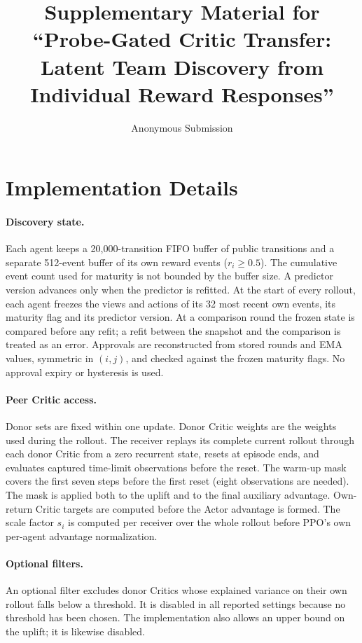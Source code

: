 \documentclass[10pt]{article}
\title{Supplementary Material for\\``Probe-Gated Critic Transfer: Latent Team Discovery from Individual Reward Responses''}
\author{Anonymous Submission}
\date{}
\begin{document}
\maketitle

\section{Implementation Details}
\paragraph{Discovery state.} Each agent keeps a 20{,}000-transition FIFO buffer of public transitions and a separate 512-event buffer of its own reward events ($r_i\ge0.5$). The cumulative event count used for maturity is not bounded by the buffer size. A predictor version advances only when the predictor is refitted. At the start of every rollout, each agent freezes the views and actions of its 32 most recent own events, its maturity flag and its predictor version. At a comparison round the frozen state is compared before any refit; a refit between the snapshot and the comparison is treated as an error. Approvals are reconstructed from stored rounds and EMA values, symmetric in $(i,j)$, and checked against the frozen maturity flags. No approval expiry or hysteresis is used.

\paragraph{Peer Critic access.} Donor sets are fixed within one update. Donor Critic weights are the weights used during the rollout. The receiver replays its complete current rollout through each donor Critic from a zero recurrent state, resets at episode ends, and evaluates captured time-limit observations before the reset. The warm-up mask covers the first seven steps before the first reset (eight observations are needed). The mask is applied both to the uplift and to the final auxiliary advantage. Own-return Critic targets are computed before the Actor advantage is formed. The scale factor $s_i$ is computed per receiver over the whole rollout before PPO's own per-agent advantage normalization.

\paragraph{Optional filters.} An optional filter excludes donor Critics whose explained variance on their own rollout falls below a threshold. It is disabled in all reported settings because no threshold has been chosen. The implementation also allows an upper bound on the uplift; it is likewise disabled.
\end{document}
